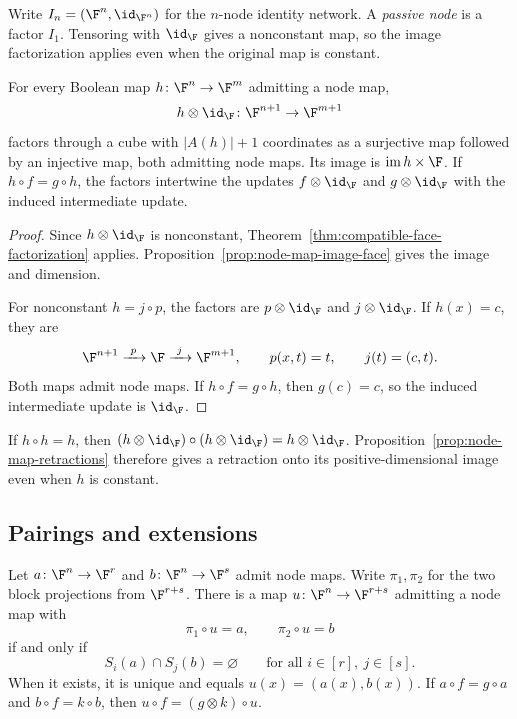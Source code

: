 Write $I_n=(\F^n,\id_{\F^n})$ for the $n$-node identity network. A \emph{passive node} is a factor $I_1$. Tensoring with $\id_{\F}$ gives a nonconstant map, so the image factorization applies even when the original map is constant.

\begin{theorem}\label{thm:passive-node-factorization}
For every Boolean map $h\colon\F^n\to\F^m$ admitting a node map,
\[
    h\otimes\id_{\F}\colon\F^{n+1}\to\F^{m+1}
\]
factors through a cube with $|A(h)|+1$ coordinates as a surjective map followed by an injective map, both admitting node maps. Its image is $\operatorname{im}h\times\F$. If $h\circ f=g\circ h$, the factors intertwine the updates $f\otimes\id_{\F}$ and $g\otimes\id_{\F}$ with the induced intermediate update.
\end{theorem}

\begin{proof}
Since $h\otimes\id_{\F}$ is nonconstant, Theorem~\ref{thm:compatible-face-factorization} applies. Proposition~\ref{prop:node-map-image-face} gives the image and dimension.

For nonconstant $h=j\circ p$, the factors are $p\otimes\id_{\F}$ and $j\otimes\id_{\F}$. If $h(x)=c$, they are
\[
    \F^{n+1}\xrightarrow{\ p\ }\F
    \xrightarrow{\ j\ }\F^{m+1},
    \qquad p(x,t)=t,\qquad j(t)=(c,t).
\]
Both maps admit node maps. If $h\circ f=g\circ h$, then $g(c)=c$, so the induced intermediate update is $\id_{\F}$.
\end{proof}

If $h\circ h=h$, then $(h\otimes\id_{\F})\circ(h\otimes\id_{\F})=h\otimes\id_{\F}$. Proposition~\ref{prop:node-map-retractions} therefore gives a retraction onto its positive-dimensional image even when $h$ is constant.

\subsection{Pairings and extensions}\label{subsec:universal-observations}

\begin{proposition}\label{prop:compatible-pairing}
Let $a\colon\F^n\to\F^r$ and $b\colon\F^n\to\F^s$ admit node maps. Write $\pi_1,\pi_2$ for the two block projections from $\F^{r+s}$. There is a map $u\colon\F^n\to\F^{r+s}$ admitting a node map with
\[
    \pi_1\circ u=a,\qquad \pi_2\circ u=b
\]
if and only if
\[
    S_i(a)\cap S_j(b)=\varnothing
    \qquad\text{for all }i\in[r],\ j\in[s].
\]
When it exists, it is unique and equals $u(x)=(a(x),b(x))$. If $a\circ f=g\circ a$ and $b\circ f=k\circ b$, then $u\circ f=(g\otimes k)\circ u$.
\end{proposition}

